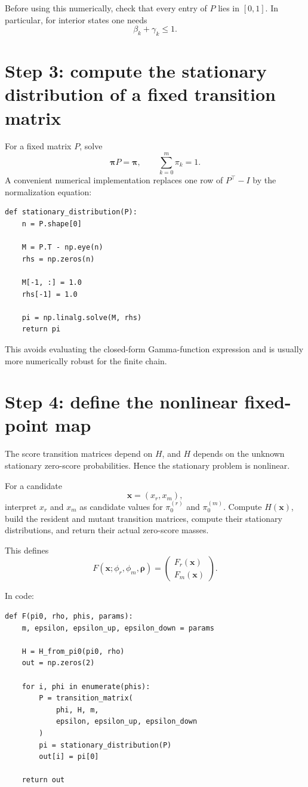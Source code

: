 \documentclass[11pt]{article}
\begin{document}
Before using this numerically, check that every entry of $P$ lies in $[0,1]$. In particular, for interior states one needs
\[
\beta_k+\gamma_k\le 1.
\]

\section{Step 3: compute the stationary distribution of a fixed transition matrix}

For a fixed matrix $P$, solve
\[
\bm{\pi}P=\bm{\pi},
\qquad
\sum_{k=0}^{m}\pi_k=1.
\]
A convenient numerical implementation replaces one row of $P^\top-I$ by the normalization equation:

\begin{lstlisting}
def stationary_distribution(P):
    n = P.shape[0]

    M = P.T - np.eye(n)
    rhs = np.zeros(n)

    M[-1, :] = 1.0
    rhs[-1] = 1.0

    pi = np.linalg.solve(M, rhs)
    return pi
\end{lstlisting}

This avoids evaluating the closed-form Gamma-function expression and is usually more numerically robust for the finite chain.

\section{Step 4: define the nonlinear fixed-point map}

The score transition matrices depend on $H$, and $H$ depends on the unknown stationary zero-score probabilities. Hence the stationary problem is nonlinear.

For a candidate
\[
\bm{x}=(x_r,x_m),
\]
interpret $x_r$ and $x_m$ as candidate values for $\pi_0^{(r)}$ and $\pi_0^{(m)}$. Compute $H(\bm{x})$, build the resident and mutant transition matrices, compute their stationary distributions, and return their actual zero-score masses.

This defines
\[
F(\bm{x};\phi_r,\phi_m,\bm{\rho})
=
\begin{pmatrix}
F_r(\bm{x})\\
F_m(\bm{x})
\end{pmatrix}.
\]

In code:

\begin{lstlisting}
def F(pi0, rho, phis, params):
    m, epsilon, epsilon_up, epsilon_down = params

    H = H_from_pi0(pi0, rho)
    out = np.zeros(2)

    for i, phi in enumerate(phis):
        P = transition_matrix(
            phi, H, m,
            epsilon, epsilon_up, epsilon_down
        )
        pi = stationary_distribution(P)
        out[i] = pi[0]

    return out
\end{lstlisting}
\end{document}
